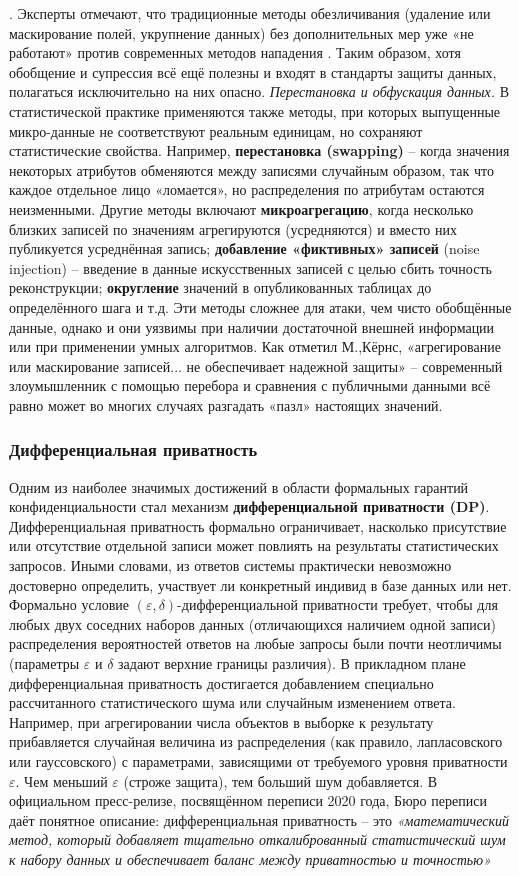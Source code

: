 . Эксперты отмечают, что традиционные методы обезличивания (удаление или маскирование полей, укрупнение данных) без дополнительных мер уже «не работают» против современных методов нападения
\autocite{blog-seas-upenn-edu}
. Таким образом, хотя обобщение и супрессия всё ещё полезны и входят в стандарты защиты данных, полагаться исключительно на них опасно. \textit{Перестановка и обфускация данных.} В статистической практике применяются также методы, при которых выпущенные микро-данные не соответствуют реальным единицам, но сохраняют статистические свойства. Например, \textbf{перестановка (swapping)} – когда значения некоторых атрибутов обменяются между записями случайным образом, так что каждое отдельное лицо «ломается», но распределения по атрибутам остаются неизменными. Другие методы включают \textbf{микроагрегацию}, когда несколько близких записей по значениям агрегируются (усредняются) и вместо них публикуется усреднённая запись; \textbf{добавление «фиктивных» записей} (noise injection) – введение в данные искусственных записей с целью сбить точность реконструкции; \textbf{округление} значений в опубликованных таблицах до определённого шага и т.д. Эти методы сложнее для атаки, чем чисто обобщённые данные, однако и они уязвимы при наличии достаточной внешней информации или при применении умных алгоритмов. Как отметил М.,Кёрнс, «агрегирование или маскирование записей... не обеспечивает надежной защиты»
\autocite{blog-seas-upenn-edu}
 – современный злоумышленник с помощью перебора и сравнения с публичными данными всё равно может во многих случаях разгадать «пазл» настоящих значений. \subsubsection{Дифференциальная приватность} \label{sec:dp}
Одним из наиболее значимых достижений в области формальных гарантий конфиденциальности стал механизм \textbf{дифференциальной приватности (DP)}. Дифференциальная приватность формально ограничивает, насколько присутствие или отсутствие отдельной записи может повлиять на результаты статистических запросов. Иными словами, из ответов системы практически невозможно достоверно определить, участвует ли конкретный индивид в базе данных или нет. Формально условие $(\varepsilon,\delta)$-дифференциальной приватности требует, чтобы для любых двух соседних наборов данных (отличающихся наличием одной записи) распределения вероятностей ответов на любые запросы были почти неотличимы (параметры $\varepsilon$ и $\delta$ задают верхние границы различия). В прикладном плане дифференциальная приватность достигается добавлением специально рассчитанного статистического шума или случайным изменением ответа. Например, при агрегировании числа объектов в выборке к результату прибавляется случайная величина из распределения (как правило, лапласовского или гауссовского) с параметрами, зависящими от требуемого уровня приватности $\varepsilon$. Чем меньший $\varepsilon$ (строже защита), тем больший шум добавляется. В официальном пресс-релизе, посвящённом переписи 2020 года, Бюро переписи даёт понятное описание: дифференциальная приватность – это \textit{«математический метод, который добавляет тщательно откалиброванный статистический шум к набору данных и обеспечивает баланс между приватностью и точностью»}
